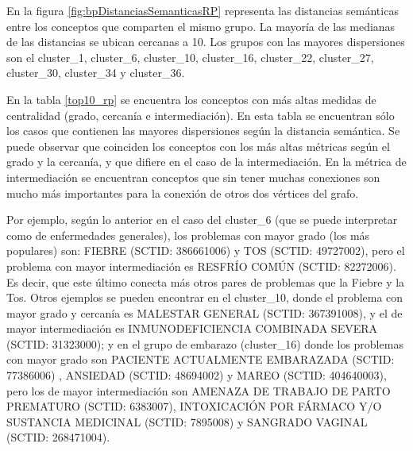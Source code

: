 En la figura \ref{fig:bpDistanciasSemanticasRP} representa las distancias semánticas entre los conceptos que comparten el mismo grupo. La mayoría de las medianas de las distancias se ubican cercanas a 10. Los grupos con las mayores dispersiones son el cluster\_1, cluster\_6, cluster\_10, cluster\_16, cluster\_22, cluster\_27, cluster\_30, cluster\_34 y cluster\_36. 

En la tabla \ref{top10_rp} se encuentra los conceptos con más altas medidas de  centralidad (grado, cercanía e intermediación). En esta tabla se encuentran sólo los casos que contienen las mayores dispersiones según la distancia semántica. Se puede observar que coinciden los conceptos con los más altas métricas según el grado y la cercanía, y que difiere en el caso de la intermediación. En la métrica de intermediación se encuentran conceptos que sin tener muchas conexiones son mucho más importantes para la conexión de otros dos vértices del grafo.

Por ejemplo, según lo anterior en el caso del cluster\_6 (que se puede interpretar como de enfermedades generales), los problemas con mayor grado (los más populares) son: FIEBRE (SCTID: 386661006) y TOS (SCTID: 49727002), pero el problema con mayor intermediación es RESFRÍO COMÚN (SCTID: 82272006). Es decir, que este último conecta más otros pares de problemas que la Fiebre y la Tos. Otros ejemplos se pueden encontrar en el cluster\_10, donde el problema con mayor grado y cercanía es MALESTAR GENERAL (SCTID: 367391008), y el de mayor intermediación es INMUNODEFICIENCIA COMBINADA SEVERA (SCTID: 31323000); y en el grupo de embarazo (cluster\_16) donde los problemas con mayor grado son PACIENTE ACTUALMENTE EMBARAZADA (SCTID: 77386006) , ANSIEDAD (SCTID: 48694002) y MAREO (SCTID: 404640003), pero los de mayor intermediación son AMENAZA DE TRABAJO DE PARTO PREMATURO (SCTID: 6383007), INTOXICACIÓN POR FÁRMACO Y/O SUSTANCIA MEDICINAL (SCTID: 7895008) y SANGRADO VAGINAL (SCTID: 268471004).

